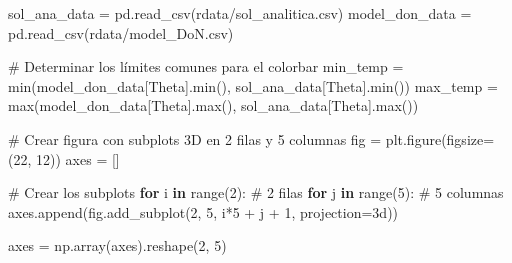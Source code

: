 \documentclass[
  spanish,
  us-letterpaper,
]{scrreprt}
\newenvironment{Shaded}{\begin{snugshade}}{\end{snugshade}}
\newcommand{\BuiltInTok}[1]{\textcolor[rgb]{0.00,0.23,0.31}{#1}}
\newcommand{\CommentTok}[1]{\textcolor[rgb]{0.37,0.37,0.37}{#1}}
\newcommand{\ControlFlowTok}[1]{\textcolor[rgb]{0.00,0.23,0.31}{\textbf{#1}}}
\newcommand{\DecValTok}[1]{\textcolor[rgb]{0.68,0.00,0.00}{#1}}
\newcommand{\KeywordTok}[1]{\textcolor[rgb]{0.00,0.23,0.31}{\textbf{#1}}}
\newcommand{\NormalTok}[1]{\textcolor[rgb]{0.00,0.23,0.31}{#1}}
\newcommand{\OperatorTok}[1]{\textcolor[rgb]{0.37,0.37,0.37}{#1}}
\newcommand{\StringTok}[1]{\textcolor[rgb]{0.13,0.47,0.30}{#1}}
\newcommand{\VerbatimStringTok}[1]{\textcolor[rgb]{0.13,0.47,0.30}{#1}}
\theoremstyle{definition}
\theoremstyle{plain}
\theoremstyle{remark}
\begin{document}
\begin{Shaded}
\begin{Highlighting}[]
\NormalTok{sol\_ana\_data }\OperatorTok{=}\NormalTok{ pd.read\_csv(}\VerbatimStringTok{r\textquotesingle{}data/sol\_analitica}\DecValTok{.}\VerbatimStringTok{csv\textquotesingle{}}\NormalTok{)}
\NormalTok{model\_don\_data }\OperatorTok{=}\NormalTok{ pd.read\_csv(}\VerbatimStringTok{r\textquotesingle{}data/model\_DoN}\DecValTok{.}\VerbatimStringTok{csv\textquotesingle{}}\NormalTok{)}

\CommentTok{\# Determinar los límites comunes para el colorbar}
\NormalTok{min\_temp }\OperatorTok{=} \BuiltInTok{min}\NormalTok{(model\_don\_data[}\StringTok{\textquotesingle{}Theta\textquotesingle{}}\NormalTok{].}\BuiltInTok{min}\NormalTok{(),}
\NormalTok{                sol\_ana\_data[}\StringTok{\textquotesingle{}Theta\textquotesingle{}}\NormalTok{].}\BuiltInTok{min}\NormalTok{())}
\NormalTok{max\_temp }\OperatorTok{=} \BuiltInTok{max}\NormalTok{(model\_don\_data[}\StringTok{\textquotesingle{}Theta\textquotesingle{}}\NormalTok{].}\BuiltInTok{max}\NormalTok{(), }
\NormalTok{                sol\_ana\_data[}\StringTok{\textquotesingle{}Theta\textquotesingle{}}\NormalTok{].}\BuiltInTok{max}\NormalTok{())}

\CommentTok{\# Crear figura con subplots 3D en 2 filas y 5 columnas}
\NormalTok{fig }\OperatorTok{=}\NormalTok{ plt.figure(figsize}\OperatorTok{=}\NormalTok{(}\DecValTok{22}\NormalTok{, }\DecValTok{12}\NormalTok{))}
\NormalTok{axes }\OperatorTok{=}\NormalTok{ []}

\CommentTok{\# Crear los subplots}
\ControlFlowTok{for}\NormalTok{ i }\KeywordTok{in} \BuiltInTok{range}\NormalTok{(}\DecValTok{2}\NormalTok{):  }\CommentTok{\# 2 filas}
    \ControlFlowTok{for}\NormalTok{ j }\KeywordTok{in} \BuiltInTok{range}\NormalTok{(}\DecValTok{5}\NormalTok{):  }\CommentTok{\# 5 columnas}
\NormalTok{        axes.append(fig.add\_subplot(}\DecValTok{2}\NormalTok{, }\DecValTok{5}\NormalTok{, i}\OperatorTok{*}\DecValTok{5} \OperatorTok{+}\NormalTok{ j }\OperatorTok{+} \DecValTok{1}\NormalTok{, projection}\OperatorTok{=}\StringTok{\textquotesingle{}3d\textquotesingle{}}\NormalTok{))}

\NormalTok{axes }\OperatorTok{=}\NormalTok{ np.array(axes).reshape(}\DecValTok{2}\NormalTok{, }\DecValTok{5}\NormalTok{)}


\end{Highlighting}
\end{Shaded}
\end{document}
